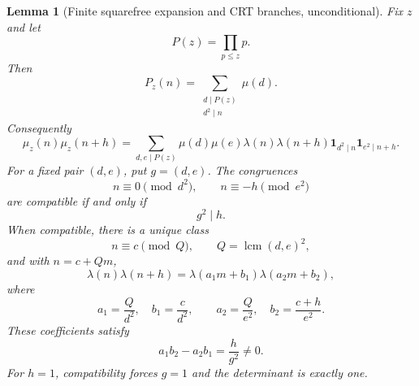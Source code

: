 \documentclass[11pt]{amsart}
\numberwithin{equation}{section}
\theoremstyle{plain}
\newtheorem{lemma}[theorem]{Lemma}
\theoremstyle{definition}
\theoremstyle{remark}
\newcommand{\one}{\mathbf 1}
\newcommand{\mob}{\mu}
\newcommand{\liou}{\lambda}
\DeclareMathOperator{\lcm}{lcm}
\begin{document}
\begin{lemma}[Finite squarefree expansion and CRT branches, unconditional]
\label{lem:finite_squarefree_CRT}
Fix $z$ and let
\begin{equation}
P(z)=\prod_{p\le z}p.
\label{eq:primorial_z}
\end{equation}
Then
\begin{equation}
P_z(n)=\sum_{\substack{d\mid P(z)\\d^2\mid n}}\mob(d).
\label{eq:Pz_inclusion_exclusion}
\end{equation}
Consequently
\begin{equation}
\mob_z(n)\mob_z(n+h)
=
\sum_{d,e\mid P(z)}
\mob(d)\mob(e)\liou(n)\liou(n+h)
\one_{d^2\mid n}\one_{e^2\mid n+h}.
\label{eq:mu_z_product_expansion}
\end{equation}
For a fixed pair $(d,e)$, put $g=(d,e)$.  The congruences
\begin{equation}
n\equiv0\pmod{d^2},
\qquad
n\equiv-h\pmod{e^2}
\label{eq:de_congruences}
\end{equation}
are compatible if and only if
\begin{equation}
g^2\mid h.
\label{eq:de_compatibility}
\end{equation}
When compatible, there is a unique class
\begin{equation}
n\equiv c\pmod Q,
\qquad
Q=\lcm(d,e)^2,
\label{eq:de_CRT_class}
\end{equation}
and with $n=c+Qm$,
\begin{equation}
\liou(n)\liou(n+h)
=\liou(a_1m+b_1)\liou(a_2m+b_2),
\label{eq:de_liouville_forms}
\end{equation}
where
\begin{equation}
a_1=\frac Q{d^2},\quad b_1=\frac c{d^2},
\qquad
a_2=\frac Q{e^2},\quad b_2=\frac{c+h}{e^2}.
\label{eq:de_affine_coefficients}
\end{equation}
These coefficients satisfy
\begin{equation}
a_1b_2-a_2b_1=\frac{h}{g^2}\ne0.
\label{eq:de_determinant}
\end{equation}
For $h=1$, compatibility forces $g=1$ and the determinant is exactly one.
\end{lemma}
\end{document}
